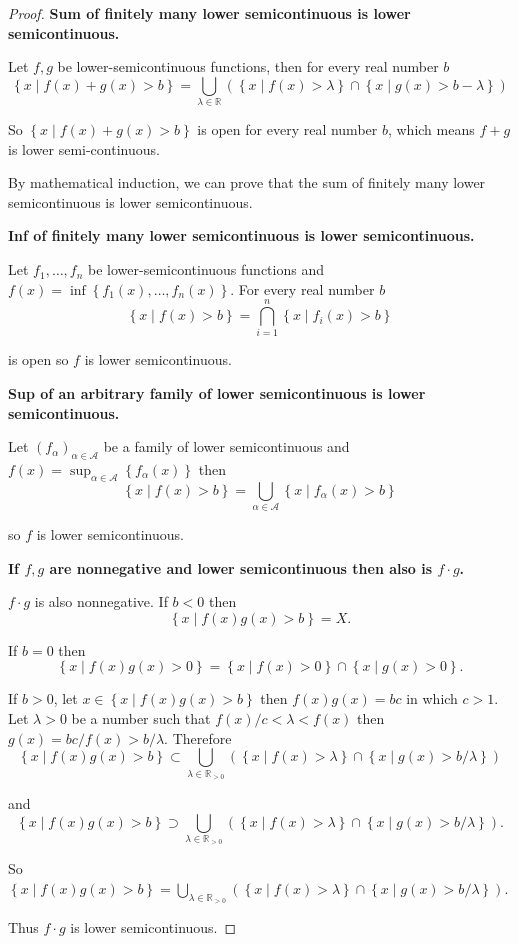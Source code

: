 \begin{proof}
	\textbf{Sum of finitely many lower semicontinuous is lower semicontinuous.}

	Let \( f, g \) be lower-semicontinuous functions, then for every real number \( b \)
	\[
		\left\{ x \mid f(x) + g(x) > b \right\} = \bigcup_{\lambda \in \mathbb{R}} (\left\{ x \mid f(x) > \lambda \right\} \cap \left\{ x \mid g(x) > b - \lambda \right\})
	\]

	So \( \left\{ x \mid f(x) + g(x) > b \right\} \) is open for every real number \( b \), which means \( f + g \) is lower semi-continuous.

	By mathematical induction, we can prove that the sum of finitely many lower semicontinuous is lower semicontinuous.

	\textbf{Inf of finitely many lower semicontinuous is lower semicontinuous.}

	Let \( f_{1}, \ldots, f_{n} \) be lower-semicontinuous functions and \( f(x) = \inf\left\{ f_{1}(x), \ldots, f_{n}(x) \right\} \). For every real number \( b \)
	\[
		\left\{ x \mid f(x) > b \right\} = \bigcap^{n}_{i=1} \left\{ x \mid f_{i}(x) > b \right\}
	\]

	is open so \( f \) is lower semicontinuous.

	\textbf{Sup of an arbitrary family of lower semicontinuous is lower semicontinuous.}

	Let \( {(f_{\alpha})}_{\alpha\in\mathscr{A}} \) be a family of lower semicontinuous and \( f(x) = \sup_{\alpha\in\mathscr{A}}\left\{ f_{\alpha}(x)  \right\} \) then
	\[
		\left\{ x \mid f(x) > b \right\} = \bigcup_{\alpha\in\mathscr{A}} \left\{ x \mid f_{\alpha}(x) > b \right\}
	\]

	so \( f \) is lower semicontinuous.

	\textbf{If \( f, g \) are nonnegative and lower semicontinuous then also is \( f\cdot g \).}

	\( f\cdot g \) is also nonnegative. If \( b < 0 \) then
	\[
		\left\{ x \mid f(x)g(x) > b \right\} = X.
	\]

	If \( b = 0 \) then
	\[
		\left\{ x \mid f(x)g(x) > 0 \right\} = \left\{ x \mid f(x) > 0 \right\} \cap \left\{ x \mid g(x) > 0 \right\}.
	\]

	If \( b > 0 \), let \( x \in \left\{ x \mid f(x)g(x) > b \right\} \) then \( f(x)g(x) = bc \) in which \( c > 1 \). Let \( \lambda > 0 \) be a number such that \( f(x)/c < \lambda < f(x) \) then \( g(x) = bc/f(x) > b/\lambda \). Therefore
	\[
		\left\{ x \mid f(x)g(x) > b \right\} \subset \bigcup_{\lambda \in \mathbb{R}_{> 0}} (\left\{ x \mid f(x) > \lambda \right\} \cap \left\{ x \mid g(x) > b/\lambda \right\})
	\]

	and
	\[
		\left\{ x \mid f(x)g(x) > b \right\} \supset \bigcup_{\lambda \in \mathbb{R}_{> 0}} (\left\{ x \mid f(x) > \lambda \right\} \cap \left\{ x \mid g(x) > b/\lambda \right\}).
	\]

	So \( \left\{ x \mid f(x)g(x) > b \right\} = \bigcup_{\lambda \in \mathbb{R}_{> 0}} (\left\{ x \mid f(x) > \lambda \right\} \cap \left\{ x \mid g(x) > b/\lambda \right\}) \).

	Thus \( f\cdot g \) is lower semicontinuous.
\end{proof}

